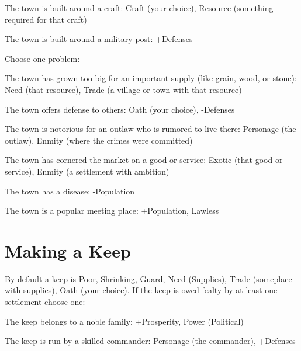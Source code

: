          
\item The town is built around a craft: Craft (your choice), Resource (something required for that craft)

         
\item The town is built around a military post: +Defenses

       
\stopitemize
       

Choose one problem:

       
\startitemize[1,packed]
         
\item The town has grown too big for an important supply (like grain, wood, or stone): Need (that resource), Trade (a village or town with that resource)

         
\item The town offers defense to others: Oath (your choice), -Defenses

         
\item The town is notorious for an outlaw who is rumored to live there: Personage (the outlaw), Enmity (where the crimes were committed)

         
\item The town has cornered the market on a good or service: Exotic (that good or service), Enmity (a settlement with ambition)

         
\item The town has a disease: -Population

         
\item The town is a popular meeting place: +Population, Lawless

       
\stopitemize
       
\section{Making a Keep}  
       

By default a keep is Poor, Shrinking, Guard, Need (Supplies), Trade (someplace with supplies), Oath (your choice). If the keep is owed fealty by at least one settlement choose one:

       
\startitemize[1,packed]
         
\item The keep belongs to a noble family: +Prosperity, Power (Political)

         
\item The keep is run by a skilled commander: Personage (the commander), +Defenses

